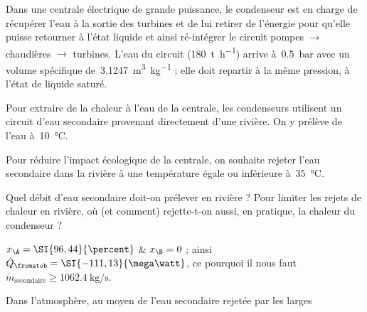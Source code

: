 \begin{Exercise}[title=Condensateur de centrale à vapeur]
  Dans une centrale électrique de grande puissance, le condenseur est en charge
  de récupérer l’eau à la sortie des turbines et de lui retirer de l’énergie
  pour qu’elle puisse retourner à l’état liquide et ainsi ré-intégrer le circuit
  pompes $\to$ chaudières $\to$ turbines. L’eau du circuit
  (\SI{180}{\tonne\per\hour}) arrive à~\SI{0,5}{\bar} avec un volume spécifique
  de~\SI{3,1247}{\metre\cubed\per\kilogram} ; elle doit repartir à la même
  pression, à l’état de liquide saturé.

	Pour extraire de la chaleur à l’eau de la centrale, les condenseurs
    utilisent un circuit d’eau secondaire provenant directement d’une rivière.
    On y prélève de l’eau à~\SI{10}{\degreeCelsius}.

	Pour réduire l’impact écologique de la centrale, on souhaite rejeter l’eau
    secondaire dans la rivière à une température égale ou inférieure
    à~\SI{35}{\degreeCelsius}.

    \Question Quel débit d’eau secondaire doit-on prélever en rivière ?
    \Question Pour limiter les rejets de chaleur en rivière, où (et comment)
    rejette-t-on aussi, en pratique, la chaleur du condenseur ?

\end{Exercise}
\begin{Answer}
  \Question  $x_\A = \SI{96,44}{\percent}$ \& $x_\B = 0$ ; ainsi $\dot
  Q_\fromatob = \SI{-111,13}{\mega\watt}$, ce pourquoi il nous faut
  $\dot{m}_\text{secondaire} \geq \SI{1062,4}{\kilogram\per\second}$.

  \Question  Dans l’atmosphère, au moyen de l’eau secondaire rejetée par les larges

\end{Answer}
